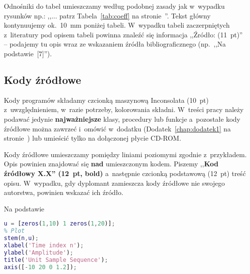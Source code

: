 \documentclass[skorowidz,skroty]{dyplomWEZUT}
\begin{document}
Odnośniki do tabel umieszczamy według podobnej zasady jak w~wypadku rysunków np.: ,,... patrz Tabela~\ref{tab:coeff} na stronie~\pageref{tab:coeff}''. Tekst główny kontynuujemy ok.~10~mm poniżej tabeli. W~wypadku tabeli zaczerpniętych z~literatury pod opisem tabeli powinna znaleźć się informacja ,,Źródło: (11~pt)'' -- podajemy tu opis wraz ze wskazaniem źródła bibliograficznego (np.~,,Na podstawie~[7]'').

\subsection{Kody źródłowe}

Kody programów składamy czcionką maszynową Inconsolata (10~pt) z~uwzględnieniem, w~razie potrzeby, kolorowania składni. W~treści pracy należy podawać jedynie \textbf{najważniejsze} klasy, procedury lub funkcje a~pozostałe kody źródłowe można zawrzeć i~omówić w~dodatku (Dodatek~\ref{chap:dodatek1} na stronie~\pageref{chap:dodatek1}) lub umieścić tylko na dołączonej płycie CD-ROM.

Kody źródłowe umieszczamy pomiędzy liniami poziomymi zgodnie z~przykładem. Opis powinien znajdować się \textbf{nad} umieszczonym kodem. Piszemy ,,\textbf{Kod źródłowy X.X'' (12~pt, bold)} a~następnie czcionką podstawową (12~pt) treść opisu. W~wypadku, gdy dyplomant zamieszcza kody źródłowe nie swojego autorstwa, powinien wskazać ich źródło.

%
%
%

{Na podstawie~\cite{Mathworks2004}}{\label{kod:prog}}
\begin{lstlisting}[language=Matlab]
% To jest przykład
u = [zeros(1,10) 1 zeros(1,20)];
% Plot
stem(n,u);
xlabel('Time index n');
ylabel('Amplitude');
title('Unit Sample Sequence');
axis([-10 20 0 1.2]);
\end{lstlisting}
\end{document}
